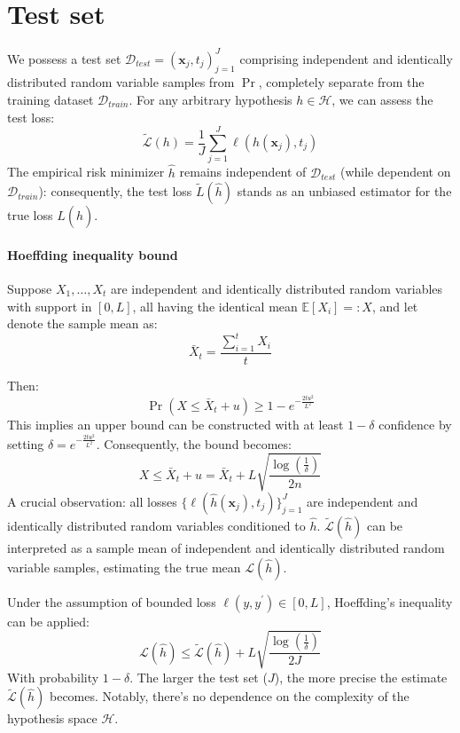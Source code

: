 \section{Test set}

We possess a test set $\mathcal{D}_{test} = {(\mathbf{x}_j , t_j )}_{j=1}^J$ comprising independent and identically distributed random variable samples from $\Pr$, completely separate from the training dataset $\mathcal{D}_{train}$.
For any arbitrary hypothesis $h\in\mathcal{H}$, we can assess the test loss:
\[\tilde{\mathcal{L}}(h)=\dfrac{1}{J}\sum_{j=1}^{J}\ell(h(\mathbf{x}_j),t_j)\]
The empirical risk minimizer $\hat{h}$ remains independent of $\mathcal{D}_{test}$ (while dependent on $\mathcal{D}_{train}$): consequently, the test loss $\tilde{L}(\hat{h})$ stands as an unbiased estimator for the true loss $L(\hat{h})$.

\paragraph*{Hoeffding inequality bound}
Suppose $X_1,\ldots, X_t$ are independent and identically distributed random variables with support in $[0, L]$, all having the identical mean $\mathbb{E}[X_i] =: X$, and let denote the sample mean as: 
\[\bar{X}_t=\dfrac{\sum_{i=1}^tX_i}{t}\] 

Then:
\[\Pr(X\leq\bar{X}_t+u)\geq1-e^{-\frac{2tu^2}{L^2}}\]
This implies an upper bound can be constructed with at least $1-\delta$ confidence by setting $\delta=e^{-\frac{2tu^2}{L^2}}$. 
Consequently, the bound becomes:
\[X\leq\bar{X}_t+u=\bar{X}_t+L\sqrt{\dfrac{\log\left(\frac{1}{\delta}\right)}{2n}}\]
A crucial observation: all losses $\{\ell(\hat{h}(\mathbf{x}_j),t_j)\}^J_{j=1}$ are independent and identically distributed random variables conditioned to $\hat{h}$. 
$\tilde{\mathcal{L}}(\hat{h})$  can be interpreted as a sample mean of independent and identically distributed random variable samples, estimating the true mean $\mathcal{L}(\hat{h})$.

Under the assumption of bounded loss $\ell(y, y^\prime) \in [0, L]$, Hoeffding's inequality can be applied:
\[\mathcal{L}(\hat{h})\leq\tilde{\mathcal{L}}(\hat{h})+L\sqrt{\dfrac{\log\left(\frac{1}{\delta}\right)}{2J}}\]
With probability $1-\delta$. 
The larger the test set ($J$), the more precise the estimate $\tilde{\mathcal{L}}(\hat{h})$ becomes. 
Notably, there's no dependence on the complexity of the hypothesis space $\mathcal{H}$.